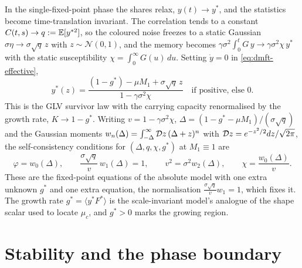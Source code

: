 In the single-fixed-point phase the shares relax, $y(t)\to y^\ast$, and the statistics
become time-translation invariant. The correlation tends to a constant $C(t,s)\to q :=
\mathbb{E}[y^{\ast 2}]$, so the coloured noise freezes to a static Gaussian $\sigma\eta \to
\sigma\sqrt q\,z$ with $z\sim\mathcal N(0,1)$, and the memory becomes
$\gamma\sigma^2\!\int_0^t G\,y \to \gamma\sigma^2\chi\,y^\ast$ with the static
susceptibility $\chi = \int_0^\infty G(u)\,du$. Setting $\dot y = 0$ in
\eqref{eq:dmft-effective},
\begin{equation}
    y^\ast(z) = \frac{(1 - g^\ast) - \mu M_1 + \sigma\sqrt q\,z}{\,1 - \gamma\sigma^2\chi\,}
    \quad\text{if positive, else } 0 .
    \label{eq:dmft-ystar}
\end{equation}
This is the GLV survivor law \citep{bunin2017,galla2018} with the carrying capacity
renormalised by the growth rate, $K \to 1 - g^\ast$. Writing $v = 1 - \gamma\sigma^2\chi$,
$\Delta = (1 - g^\ast - \mu M_1)/(\sigma\sqrt q)$ and the Gaussian moments $w_n(\Delta) =
\int_{-\Delta}^\infty \mathcal{D}z\,(\Delta+z)^n$ with $\mathcal{D}z = e^{-z^2/2}dz/\sqrt{2\pi}$, the
self-consistency conditions for $(\Delta, q, \chi, g^\ast)$ at $M_1\equiv 1$ are
\begin{equation}
    \varphi = w_0(\Delta),\qquad
    \frac{\sigma\sqrt q}{v}\,w_1(\Delta) = 1,\qquad
    v^2 = \sigma^2 w_2(\Delta),\qquad
    \chi = \frac{w_0(\Delta)}{v} .
    \label{eq:dmft-sc}
\end{equation}
These are the fixed-point equations of the absolute model with one extra unknown $g^\ast$
and one extra equation, the normalisation $\tfrac{\sigma\sqrt q}{v} w_1 = 1$, which fixes
it. The growth rate $g^\ast = \langle y^\ast F^\ast\rangle$ is the scale-invariant model's
analogue of the shape scalar used to locate $\mu_c$, and $g^\ast > 0$ marks the growing
region.

\section{Stability and the phase boundary}
\label{sec:dmft-boundary}

